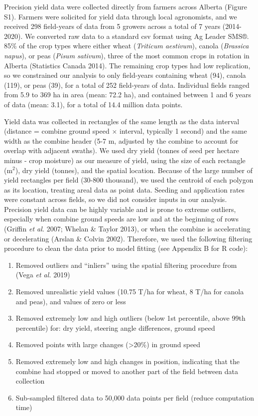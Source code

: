 \documentclass[]{elsarticle} %
\providecommand{\tightlist}{%
  \setlength{\itemsep}{0pt}\setlength{\parskip}{0pt}}
\begin{document}
Precision yield data were collected directly from farmers across Alberta (Figure S1).
Farmers were solicited for yield data through local agronomists, and we received 298 field-years of data from 5 growers across a total of 7 years (2014-2020).
We converted raw data to a standard csv format using Ag Leader SMS®.
85\% of the crop types where either wheat (\emph{Triticum aestivum}), canola (\emph{Brassica napus}), or peas (\emph{Pisum sativum}), three of the most common crops in rotation in Alberta (Statistics Canada 2014).
The remaining crop types had low replication, so we constrained our analysis to only field-years containing wheat (94), canola (119), or peas (39), for a total of 252 field-years of data.
Individual fields ranged from 5.9 to 369 ha in area (mean: 72.2 ha), and contained between 1 and 6 years of data (mean: 3.1), for a total of 14.4 million data points.

Yield data was collected in rectangles of the same length as the data interval (distance = combine ground speed \(\times\) interval, typically 1 second) and the same width as the combine header (5-7 m, adjusted by the combine to account for overlap with adjacent swaths).
We used dry yield (tonnes of seed per hectare minus - crop moisture) as our measure of yield, using the size of each rectangle (m\(^2\)), dry yield (tonnes), and the spatial location.
Because of the large number of yield rectangles per field (30-800 thousand), we used the centroid of each polygon as its location, treating areal data as point data.
Seeding and application rates were constant across fields, so we did not consider inputs in our analysis.
Precision yield data can be highly variable and is prone to extreme outliers, especially when combine ground speeds are low and at the beginning of rows (Griffin \emph{et al.} 2007; Whelan \& Taylor 2013), or when the combine is accelerating or decelerating (Arslan \& Colvin 2002).
Therefore, we used the following filtering procedure to clean the data prior to model fitting (see Appendix B for R code):

\begin{enumerate}
\def\labelenumi{\arabic{enumi}.}
\tightlist
\item
  Removed outliers and ``inliers'' using the spatial filtering procedure from (Vega \emph{et al.} 2019)
\item
  Removed unrealistic yield values (10.75 T/ha for wheat, 8 T/ha for canola and peas), and values of zero or less
\item
  Removed extremely low and high outliers (below 1st percentile, above 99th percentile) for: dry yield, steering angle differences, ground speed
\item
  Removed points with large changes (\textgreater20\%) in ground speed
\item
  Removed extremely low and high changes in position, indicating that the combine had stopped or moved to another part of the field between data collection
\item
  Sub-sampled filtered data to 50,000 data points per field (reduce computation time)
\end{enumerate}
\end{document}
